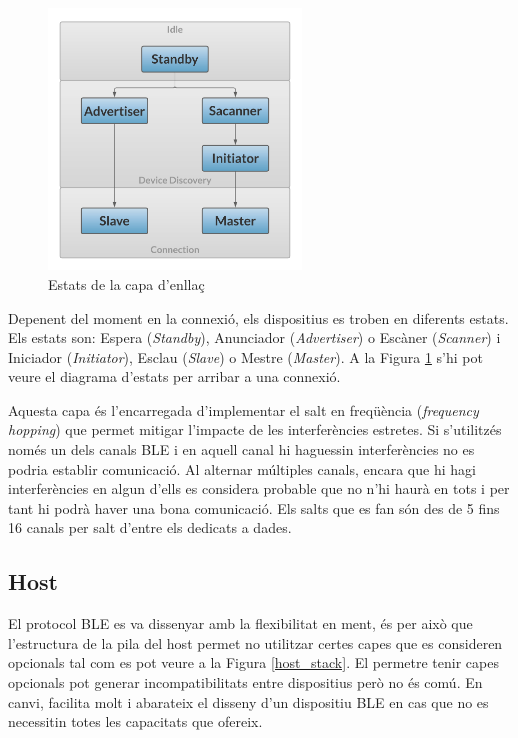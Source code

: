 \begin{figure}[!h]
	\begin{center}
		\includegraphics[width=0.6\textwidth]{./images/link_state_diagram.png}
		\caption{Estats de la capa d'enllaç \cite{Link_Layer_states}}
		\label{Link_State_Diagram}
	\end{center}
\end{figure}

Depenent del moment en la connexió, els dispositius es troben en diferents estats.
Els estats son: Espera (\textit{Standby}), Anunciador (\textit{Advertiser}) o Escàner (\textit{Scanner}) i Iniciador (\textit{Initiator}), Esclau (\textit{Slave}) o Mestre (\textit{Master}).
A la Figura \ref{Link_State_Diagram} s'hi pot veure el diagrama d'estats per arribar a una connexió.

Aquesta capa és l'encarregada d'implementar el salt en freqüència (\textit{frequency hopping}) que permet mitigar l'impacte de les interferències estretes.
Si s'utilitzés només un dels canals BLE i en aquell canal hi haguessin interferències no es podria establir comunicació.
Al alternar múltiples canals, encara que hi hagi interferències en algun d'ells es considera probable que no n'hi haurà en tots i per tant hi podrà haver una bona comunicació.
Els salts que es fan són des de 5 fins 16 canals per salt d'entre els dedicats a dades.

\subsection{Host}
El protocol BLE es va dissenyar amb la flexibilitat en ment, és per això que l'estructura de la pila del host permet no utilitzar certes capes que es consideren opcionals tal com es pot veure a la Figura \ref{host_stack}.
El permetre tenir capes opcionals pot generar incompatibilitats entre dispositius però no és comú.
En canvi, facilita molt i abarateix el disseny d'un dispositiu BLE en cas que no es necessitin totes les capacitats que ofereix.

